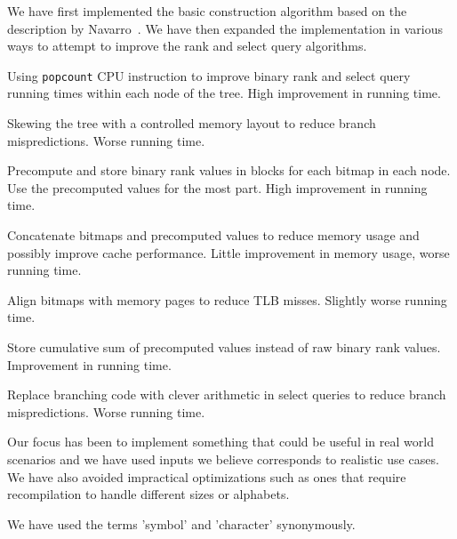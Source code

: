 We have first implemented the basic construction algorithm based on the description by Navarro~\citep[Section 2]{Navjda13}.
We have then expanded the implementation in various ways to attempt to improve the rank and select query algorithms.
\begin{description*}
\item[Using \texttt{popcount} CPU instruction] to improve binary rank and select query running times within each node of the tree. High improvement in running time.
\item[Skewing the tree] with a controlled memory layout to reduce branch mispredictions. Worse running time.
\item[Precompute and store binary rank values] in blocks for each bitmap in each node. Use the precomputed values for the most part. High improvement in running time.
\item[Concatenate bitmaps and precomputed values] to reduce memory usage and possibly improve cache performance. Little improvement in memory usage, worse running time.
\item[Align bitmaps with memory pages] to reduce TLB misses. Slightly worse running time.
\item[Store cumulative sum of precomputed values] instead of raw binary rank values. Improvement in running time.
\item[Replace branching code with clever arithmetic] in select queries to reduce branch mispredictions. Worse running time.
\end{description*}
Our focus has been to implement something that could be useful in real world scenarios and we have used inputs we believe corresponds to realistic use cases.
We have also avoided impractical optimizations such as ones that require recompilation to handle different sizes or alphabets.

We have used the terms 'symbol' and 'character' synonymously.